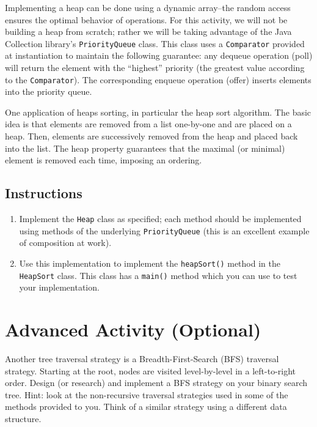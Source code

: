 \documentclass[12pt]{scrartcl}
\begin{document}
Implementing a heap can be done using a dynamic array--the random 
access ensures the optimal behavior of operations.  For this 
activity, we will not be building a heap from scratch; rather we 
will be taking advantage of the Java Collection library's 
\texttt{PriorityQueue} class.  This class uses a 
\texttt{Comparator} provided at instantiation to maintain 
the following guarantee: any dequeue operation (poll) will return 
the element with the ``highest'' priority (the greatest value 
according to the \texttt{Comparator}).  The corresponding 
enqueue operation (offer) inserts elements into the priority queue.

One application of heaps sorting, in particular the heap sort 
algorithm.  The basic idea is that elements are removed from a 
list one-by-one and are placed on a heap.  Then, elements are 
successively removed from the heap and placed back into the list.  
The heap property guarantees that the maximal (or minimal) element 
is removed each time, imposing an ordering.

\subsection*{Instructions}

\begin{enumerate}
  \item Implement the \texttt{Heap} class as specified; 
    each method should be implemented using methods of the 
    underlying \texttt{PriorityQueue} (this is an
    excellent example of composition at work).
  \item Use this implementation to implement the 
    \texttt{heapSort()} method in the 
    \texttt{HeapSort} class.  This class has a 
    \texttt{main()} method which you can use to test 
    your implementation.
\end{enumerate}
    
\section*{Advanced Activity (Optional)}

Another tree traversal strategy is a Breadth-First-Search (BFS) traversal 
strategy.  Starting at the root, nodes are visited level-by-level 
in a left-to-right order.  Design (or research) and implement a 
BFS strategy on your binary search tree.  Hint: look at the 
non-recursive traversal strategies used in some of the methods 
provided to you.  Think of a similar strategy using a different data 
structure.
\end{document}
